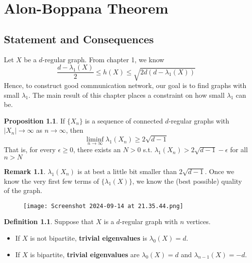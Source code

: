 \documentclass{book}
\newcommand{\define}[1]{\textbf{#1}}
\theoremstyle{definition}
\newtheorem{proposition}[lemma]{Proposition}
\newtheorem{definition}[lemma]{Definition}
\theoremstyle{remarkstyle}
\newtheorem*{remark}{Remark}%
\begin{document}
\setcounter{chapter}{2}
\chapter{Alon-Boppana Theorem}


\section{Statement and Consequences}
Let $X$ be a $d$-regular graph. From chapter 1, we know $$\frac{d-\lambda_{1}(X)}{2} \le h(X) \le \sqrt{2d(d-\lambda_{1}(X))} $$ Hence, to construct good communication network, our goal is to find graphs with small $\lambda_{1}$. The main result of this chapter places a constraint on how small $\lambda_{1}$ can be. 

\begin{proposition}
\label{Alan-Boppana}
If $\{X_{n} \}$ is a sequence of connected $d$-regular graphs with $|X_{n}|\rightarrow \infty $ as $n \rightarrow \infty$, then $$\liminf_{n\rightarrow \infty}\lambda_{1}(X_{n}) \ge 2\sqrt{d-1} $$ That is, for every $\epsilon \ge 0$, there exists an $N >0$ s.t. $\lambda_{1}(X_{n}) > 2\sqrt{d-1} - \epsilon$ for all $n>N$ 
\end{proposition} 
\begin{remark} 
$\lambda_{1}(X_{n})$ is at best a little bit smaller than $2\sqrt{d-1}$. Once we know the very first few terms of $\{\lambda_{1}(X) \}$, we know the (best possible) quality of the graph. 
\end{remark}
\begin{figure}[htbp!]
    \texttt{[image: Screenshot 2024-09-14 at 21.35.44.png]}
    \caption{}
\end{figure}

\begin{definition}
    Suppose that $X$ is a $d$-regular graph with $n$ vertices. 
    \begin{itemize}
        \item  If $X$ is not bipartite, \define{trivial eigenvalues} is $\lambda_{0}(X) = d $.
        \item If $X$ is bipartite, \define{trivial eigenvalues} are $\lambda_{0}(X)=d$ and $\lambda_{n-1}(X)=-d $.
    \end{itemize}
\end{definition}
\end{document}
